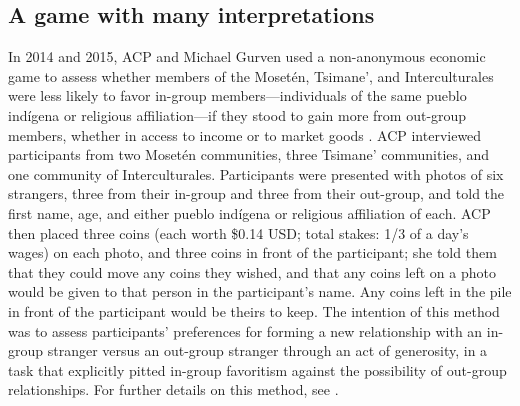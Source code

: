 \documentclass[bibauthoryear]{aa}
\begin{document}
\subsection{A game with many interpretations}\label{boliviagame}

In 2014 and 2015, ACP and Michael Gurven used a non-anonymous economic game to assess whether members of the Moset\'en, Tsimane', and Interculturales were less likely to favor in-group members---individuals of the same pueblo ind\'igena or religious affiliation---if they stood to gain more from out-group members, whether in access to income or to market goods \citep{pisor2016risk, pisor2018diversify}. ACP interviewed participants from two Moset\'en communities, three Tsimane' communities, and one community of Interculturales. Participants were presented with photos of six strangers, three from their in-group and three from their out-group, and told the first name, age, and either pueblo ind\'igena or religious affiliation of each. ACP then placed three coins (each worth \$0.14 USD; total stakes: 1/3 of a day's wages) on each photo, and three coins in front of the participant; she told them that they could move any coins they wished, and that any coins left on a photo would be given to that person in the participant's name. Any coins left in the pile in front of the participant would be theirs to keep. The intention of this method was to assess participants' preferences for forming a new relationship with an in-group stranger versus an out-group stranger through an act of generosity, in a task that explicitly pitted in-group favoritism against the possibility of out-group relationships. For further details on this method, see \citet{pisor2016risk, pisor2018diversify}.
\end{document}
